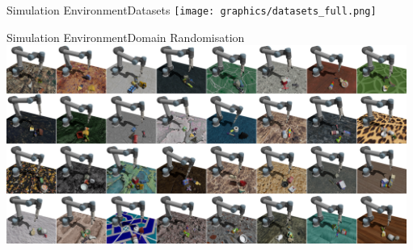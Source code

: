 \begin{frame}{Simulation Environment}{Datasets}
    \centering
    \texttt{[image: graphics/datasets\_full.png]}
\end{frame}

\begin{frame}{Simulation Environment}{Domain Randomisation}
    \centering
    \includegraphics[height=6.5cm]{graphics/domain_randomisation.png}
\end{frame}

